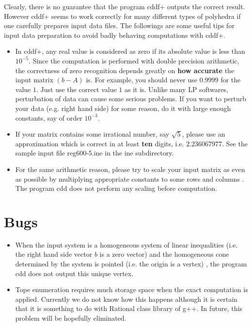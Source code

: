 \documentclass[11pt]{article}
\begin{document}
Clearly, there is no guarantee 
that the program cddf+ outputs the correct result.  
However cddf+ seems to work correctly 
for many different types of polyhedra if one
carefully prepares input data files.   The followings
are some useful tips  for  input data preparation to 
avoid badly behaving computations with cddf+.

\begin{itemize}

\item  In cddf+, any real value is considered as zero if its absolute value is
less than $10^{-5}$.  Since the computation is performed with double precision
arithmetic, the correctness of zero recognition depends greatly on {\bf how
accurate\/} the input matrix $(b- A)$ is.  For example, you should never use
$0.9999$ for the value $1$.  Just use the correct value $1$ as it is.
Unlike many LP softwares, perturbation of data
can cause some serious problems.  If you want to perturb your data (e.g. right
hand side) for some reason, do it with large enough constants, say of order
$10^{-3}$.


\item If your matrix contains some irrational number, say
$\sqrt{5}$, please use an approximation which is correct in at least {\bf ten\/} digits,
i.e.  $2.236067977$.   See the sample input file  reg600-5.ine in the ine subdirectory.
 
\item  For the same arithmetic reason, please try to scale your input matrix
as even as possible by multiplying appropriate constants to some rows and
columns .   The program cdd does not perform any scaling before
computation.

\end{itemize}

\section{Bugs}  \label{BUGS}
\begin{itemize}

\item When the input system is a homogeneous system of linear inequalities
(i.e. the right hand side vector $b$ is a zero vector) and the homogeneous
cone determined by the system is pointed (i.e. the origin is a vertex) , 
the program cdd does not output this unique vertex.

\item Tope enumeration requires much storage space when the exact
computation is applied.  Currently we do not know how this happens
although it is certain that it is something to do with Rational class
library of g++. In future, this problem will be hopefully eliminated.

\end{itemize}
\end{document}
